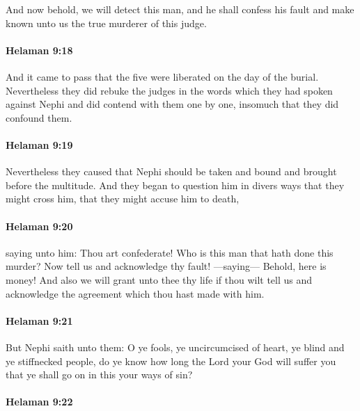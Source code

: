 			And now behold, we will detect this man,
			and he shall confess his fault
			and make known unto us the true murderer of this judge.

		\paragraph{Helaman 9:18} %
			\label{HELAMAN-9-18}

			And it came to pass that the five were liberated on the day of the burial.
			Nevertheless they did rebuke the judges
			in the words which they had spoken against Nephi
			and did contend with them one by one,
			insomuch that they did confound them.

		\paragraph{Helaman 9:19} %
			\label{HELAMAN-9-19}

			Nevertheless they caused that Nephi should be taken and bound
			and brought before the multitude.
			And they began to question him in divers ways that they might cross him,
			that they might accuse him to death,

		\paragraph{Helaman 9:20} %
			\label{HELAMAN-9-20}

			saying unto him:
			Thou art confederate!
			Who is this man that hath done this murder?
			Now tell us and acknowledge thy fault!
			---saying---
			Behold, here is money!
			And also we will grant unto thee thy life
			if thou wilt tell us and acknowledge the agreement
			which thou hast made with him.

		\paragraph{Helaman 9:21} %
			\label{HELAMAN-9-21}

			But Nephi saith unto them:
			O ye fools, ye uncircumcised of heart,
			ye blind and ye stiffnecked people,
			do ye know how long the Lord your God will suffer you
			that ye shall go on in this your ways of sin?

		\paragraph{Helaman 9:22} %
			\label{HELAMAN-9-22}

